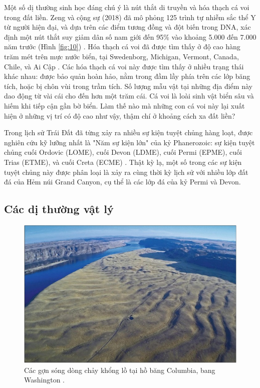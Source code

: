 \documentclass[10pt,twocolumn,letterpaper]{article}
\begin{document}
Một số dị thường sinh học đáng chú ý là nút thắt di truyền và hóa thạch cá voi trong đất liền. Zeng và cộng sự (2018) đã mô phỏng 125 trình tự nhiễm sắc thể Y từ người hiện đại, và dựa trên các điểm tương đồng và đột biến trong DNA, xác định một nút thắt suy giảm dân số nam giới đến 95\% vào khoảng 5.000 đến 7.000 năm trước (Hình \ref{fig:10}) \cite{62}. Hóa thạch cá voi đã được tìm thấy ở độ cao hàng trăm mét trên mực nước biển, tại Swedenborg, Michigan, Vermont, Canada, Chile, và Ai Cập \cite{63,64,65,66}. Các hóa thạch cá voi này được tìm thấy ở nhiều trạng thái khác nhau: được bảo quản hoàn hảo, nằm trong đầm lầy phía trên các lớp băng tích, hoặc bị chôn vùi trong trầm tích. Số lượng mẫu vật tại những địa điểm này dao động từ vài cái cho đến hơn một trăm cái. Cá voi là loài sinh vật biển sâu và hiếm khi tiếp cận gần bờ biển. Làm thế nào mà những con cá voi này lại xuất hiện ở những vị trí có độ cao như vậy, thậm chí ở khoảng cách xa đất liền?

Trong lịch sử Trái Đất đã từng xảy ra nhiều sự kiện tuyệt chủng hàng loạt, được nghiên cứu kỹ lưỡng nhất là "Năm sự kiện lớn" của kỷ Phanerozoic: sự kiện tuyệt chủng cuối Ordovic (LOME), cuối Devon (LDME), cuối Permi (EPME), cuối Trias (ETME), và cuối Creta (ECME) \cite{88,89}. Thật kỳ lạ, một số trong các sự kiện tuyệt chủng này được phân loại là xảy ra cùng thời kỳ lịch sử với nhiều lớp đất đá của Hẻm núi Grand Canyon, cụ thể là các lớp đá của kỷ Permi và Devon.

\subsection{Các dị thường vật lý}

\begin{figure}[b]
\begin{center}
   \includegraphics[width=1\linewidth]{columbia.jpg}
\end{center}
   \caption{Các gợn sóng dòng chảy khổng lồ tại hồ băng Columbia, bang Washington \cite{80}.}
\label{fig:11}
\label{fig:onecol}
\end{figure}
\end{document}

